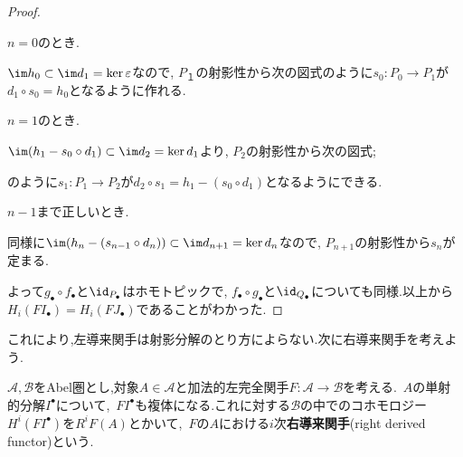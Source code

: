 \begin{proof}
\begin{step}
	\item $n=0$のとき.
	
	$\im h_0\subset\im d_1=\ker\varepsilon$なので, $P_１$の射影性から次の図式のように$s_0:P_0\to P_1$が$d_1\circ s_0=h_0$となるように作れる.
	
	\begin{figure}[H]
		\centering
		\caption{}
	\end{figure}

	\item $n=1$のとき.
	
	$\im (h_1-s_0\circ d_1)\subset\im d_2=\ker d_1$より, $P_2$の射影性から次の図式;
	
	\begin{figure}[H]
		\centering
		\caption{}
	\end{figure}
	
	のように$s_1:P_1\to P_2$が$d_2\circ s_1=h_1-(s_0\circ d_1)$となるようにできる.

	\item $n-1$まで正しいとき.
	
	同様に$\im (h_n-(s_{n-1}\circ d_n))\subset \im d_{n+1}=\ker d_n$なので, $P_{n+1}$の射影性から$s_n$が定まる.
\end{step}


よって$g_\bullet\circ f_\bullet$と$\id_{P_\bullet}$はホモトピックで, $f_\bullet\circ g_\bullet$と$\id_{Q_\bullet}$についても同様.以上から$H_i(FI_\bullet)=H_i(FJ_\bullet)$であることがわかった.
\end{proof}

これにより,左導来関手は射影分解のとり方によらない.次に右導来関手を考えよう.

\begin{defi}[右導来関手]
	$\mathscr{A,B}$をAbel圏とし,対象$A\in\mathscr{A}$と加法的左完全関手$F:\mathscr{A}\to\mathscr{B}$を考える.~$A$の単射的分解$I^\bullet$について,~$F I^\bullet$も複体になる.これに対する$\mathscr{B}$の中でのコホモロジー$H^i(F I^\bullet)$を$R^i F (A)$とかいて,~$F$の$A$における$i$次\textbf{右導来関手}(right derived functor)という.
\end{defi}

